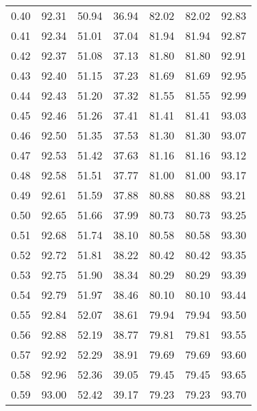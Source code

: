 \begin{tabular}{|c|c|c|c|c|c|c|}
      0.40 &     92.31 &     50.94 &      36.94 &   82.02 &      82.02 &         92.83 \\
      0.41 &     92.34 &     51.01 &      37.04 &   81.94 &      81.94 &         92.87 \\
      0.42 &     92.37 &     51.08 &      37.13 &   81.80 &      81.80 &         92.91 \\
      0.43 &     92.40 &     51.15 &      37.23 &   81.69 &      81.69 &         92.95 \\
      0.44 &     92.43 &     51.20 &      37.32 &   81.55 &      81.55 &         92.99 \\
      0.45 &     92.46 &     51.26 &      37.41 &   81.41 &      81.41 &         93.03 \\
      0.46 &     92.50 &     51.35 &      37.53 &   81.30 &      81.30 &         93.07 \\
      0.47 &     92.53 &     51.42 &      37.63 &   81.16 &      81.16 &         93.12 \\
      0.48 &     92.58 &     51.51 &      37.77 &   81.00 &      81.00 &         93.17 \\
      0.49 &     92.61 &     51.59 &      37.88 &   80.88 &      80.88 &         93.21 \\
      0.50 &     92.65 &     51.66 &      37.99 &   80.73 &      80.73 &         93.25 \\
      0.51 &     92.68 &     51.74 &      38.10 &   80.58 &      80.58 &         93.30 \\
      0.52 &     92.72 &     51.81 &      38.22 &   80.42 &      80.42 &         93.35 \\
      0.53 &     92.75 &     51.90 &      38.34 &   80.29 &      80.29 &         93.39 \\
      0.54 &     92.79 &     51.97 &      38.46 &   80.10 &      80.10 &         93.44 \\
      0.55 &     92.84 &     52.07 &      38.61 &   79.94 &      79.94 &         93.50 \\
      0.56 &     92.88 &     52.19 &      38.77 &   79.81 &      79.81 &         93.55 \\
      0.57 &     92.92 &     52.29 &      38.91 &   79.69 &      79.69 &         93.60 \\
      0.58 &     92.96 &     52.36 &      39.05 &   79.45 &      79.45 &         93.65 \\
      0.59 &     93.00 &     52.42 &      39.17 &   79.23 &      79.23 &         93.70 \\

\end{tabular}
